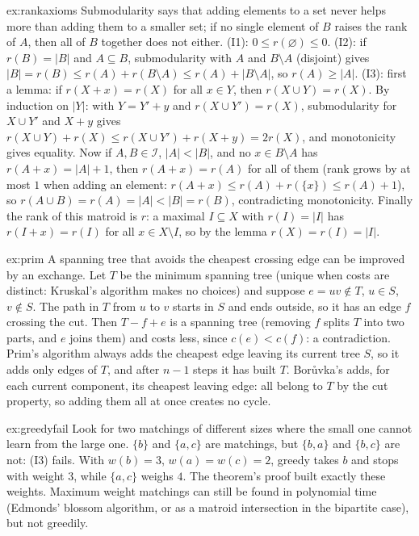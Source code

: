 \begin{solution}{ex:rankaxioms}
\idea Submodularity says that adding elements to a set never helps more than adding them to a smaller set; if no single element of $B$ raises the rank of $A$, then all of $B$ together does not either.
\writeup (I1): $0\le r(\varnothing)\le0$. (I2): if $r(B)=|B|$ and $A\subseteq B$, submodularity with $A$ and $B\setminus A$ (disjoint) gives $|B|=r(B)\le r(A)+r(B\setminus A)\le r(A)+|B\setminus A|$, so $r(A)\ge|A|$. (I3): first a lemma: if
$r(X+x)=r(X)$ for all $x\in Y$, then $r(X\cup Y)=r(X)$. By induction on $|Y|$: with $Y=Y'+y$ and $r(X\cup Y')=r(X)$, submodularity for $X\cup Y'$ and $X+y$ gives $r(X\cup Y)+r(X)\le r(X\cup Y')+r(X+y)=2r(X)$, and monotonicity gives
equality. Now if $A,B\in\mathcal I$, $|A|<|B|$, and no $x\in B\setminus A$ has $r(A+x)=|A|+1$, then $r(A+x)=r(A)$ for all of them (rank grows by at most $1$ when adding an element: $r(A+x)\le r(A)+r(\{x\})\le r(A)+1$),
so $r(A\cup B)=r(A)=|A|<|B|=r(B)$, contradicting monotonicity. Finally the rank of this matroid is $r$: a maximal $I\subseteq X$ with $r(I)=|I|$ has $r(I+x)=r(I)$ for all $x\in X\setminus I$, so by the lemma $r(X)=r(I)=|I|$.
\end{solution}

\begin{solution}{ex:prim}
\idea A spanning tree that avoids the cheapest crossing edge can be improved by an exchange.
\writeup Let $T$ be the minimum spanning tree (unique when costs are distinct: Kruskal's algorithm makes no choices) and suppose $e=uv\notin T$, $u\in S$, $v\notin S$. The path in $T$ from $u$ to $v$ starts in $S$ and ends outside,
so it has an edge $f$ crossing the cut. Then $T-f+e$ is a spanning tree (removing $f$ splits $T$ into two parts, and $e$ joins them) and costs less, since $c(e)<c(f)$: a contradiction. Prim's algorithm always adds the
cheapest edge leaving its current tree $S$, so it adds only edges of $T$, and after $n-1$ steps it has built $T$. Bor\r{u}vka's adds, for each current component, its cheapest leaving edge: all belong to $T$ by the cut property, so
adding them all at once creates no cycle.
\end{solution}

\begin{solution}{ex:greedyfail}
\idea Look for two matchings of different sizes where the small one cannot learn from the large one.
\writeup $\{b\}$ and $\{a,c\}$ are matchings, but $\{b,a\}$ and $\{b,c\}$ are not: (I3) fails. With $w(b)=3$, $w(a)=w(c)=2$, greedy takes $b$ and stops with weight $3$, while $\{a,c\}$ weighs $4$. The theorem's proof built
exactly these weights. Maximum weight matchings can still be found in polynomial time (Edmonds' blossom algorithm, or as a matroid intersection in the bipartite case), but not greedily.
\end{solution}

